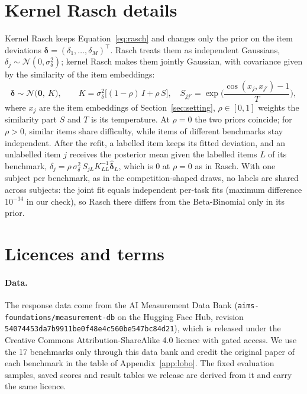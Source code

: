 \documentclass{article}
\newcommand{\code}[1]{\texttt{#1}}
\begin{document}
\begin{table}[H]
\centering
\caption{Sweep of the switch threshold $\eta$ over the 17 benchmarks. The fitted prior is kept while the accuracy so far lies within $\eta$ of its mean, and $\eta=\infty$ never switches. Columns as in Table~\ref{tab:adaptive}.}
\label{tab:switch}
\small

\end{table}

\section{Kernel Rasch details}\label{app:kernel}
Kernel Rasch keeps Equation~\eqref{eq:rasch} and changes only the prior on the item deviations $\boldsymbol\delta=(\delta_1,\dots,\delta_M)^{\top}$. Rasch treats them as independent Gaussians, $\delta_j\sim\mathcal N(0,\sigma_\delta^2)$; kernel Rasch makes them jointly Gaussian, with covariance given by the similarity of the item embeddings:
\begin{equation}\label{eq:kernel}
\boldsymbol\delta\sim\mathcal N\big(\mathbf 0,\ K\big),\qquad K=\sigma_\delta^2\big[(1-\rho)\,I+\rho\,S\big],\quad S_{jj'}=\exp\!\Big(\frac{\cos(x_j,x_{j'})-1}{T}\Big),
\end{equation}
where $x_j$ are the item embeddings of Section~\ref{sec:setting}, $\rho\in[0,1]$ weights the similarity part $S$ and $T$ is its temperature. At $\rho=0$ the two priors coincide; for $\rho>0$, similar items share difficulty, while items of different benchmarks stay independent. After the refit, a labelled item keeps its fitted deviation, and an unlabelled item $j$ receives the posterior mean given the labelled items $L$ of its benchmark, $\hat\delta_j=\rho\,\sigma_\delta^2\,S_{jL}K_{LL}^{-1}\hat{\boldsymbol\delta}_L$, which is $0$ at $\rho=0$ as in Rasch. With one subject per benchmark, as in the competition-shaped draws, no labels are shared across subjects: the joint fit equals independent per-task fits (maximum difference $10^{-14}$ in our check), so Rasch there differs from the Beta-Binomial only in its prior.

\section{Licences and terms}\label{app:licences}
\paragraph{Data.} The response data come from the AI Measurement Data Bank (\code{aims-foundations/measurement-db} on the Hugging Face Hub, revision \code{54074453da7b9911be0f48e4c560be547bc84d21}), which is released under the Creative Commons Attribution-ShareAlike 4.0 licence with gated access. We use the 17 benchmarks only through this data bank and credit the original paper of each benchmark in the table of Appendix~\ref{app:lobo}. The fixed evaluation samples, saved scores and result tables we release are derived from it and carry the same licence.
\end{document}

